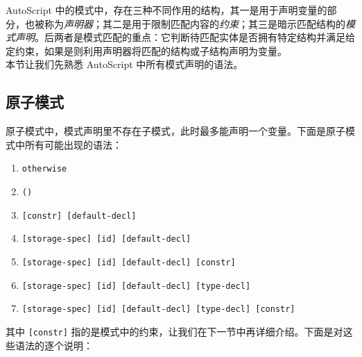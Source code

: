 AutoScript 中的模式中，存在三种不同作用的结构，其一是用于声明变量的部分，也被称为\emph{声明器}；其二是用于限制匹配内容的\emph{约束}；其三是暗示匹配结构的\emph{模式声明}。后两者是模式匹配的重点：它判断待匹配实体是否拥有特定结构并满足给定约束，如果是则利用声明器将匹配的结构或子结构声明为变量。 \\

本节让我们先熟悉 AutoScript 中所有模式声明的语法。

\subsection{原子模式}

原子模式中，模式声明里不存在子模式，此时最多能声明一个变量。下面是原子模式中所有可能出现的语法：

\begin{grammar} \label{grm:atomic-pattern}
\begin{enumerate}
    \item \lstinline!otherwise!
    \item \texttt{()}
    \item \texttt{[constr] [default-decl]}
    \item \texttt{[storage-spec] [id] [default-decl]}
    \item \texttt{[storage-spec] [id] [default-decl] [constr]}
    \item \texttt{[storage-spec] [id] [default-decl] [type-decl]}
    \item \texttt{[storage-spec] [id] [default-decl] [type-decl] [constr]}
\end{enumerate}
\end{grammar}

其中 \lstinline![constr]! 指的是模式中的约束，让我们在下一节中再详细介绍。下面是对这些语法的逐个说明：


